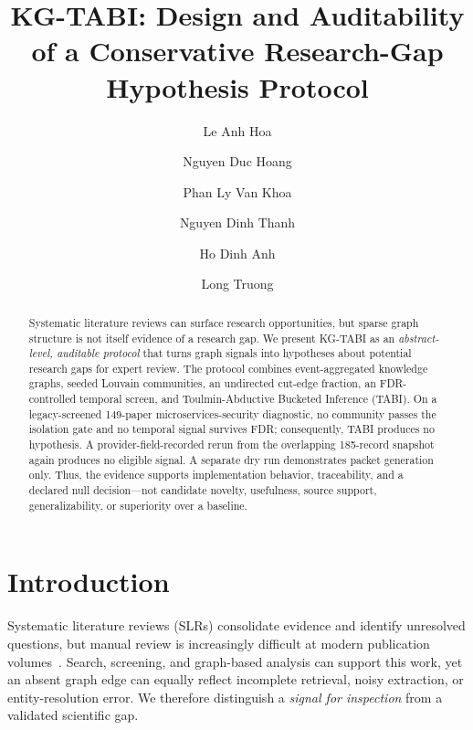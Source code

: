 \documentclass[runningheads]{llncs}
\begin{document}
\title{KG-TABI: Design and Auditability of a Conservative Research-Gap Hypothesis Protocol}
\author{Le Anh Hoa \and
Nguyen Duc Hoang \and
Phan Ly Van Khoa \and
Nguyen Dinh Thanh \and
Ho Dinh Anh \and
Long Truong}
\maketitle

\begin{abstract}
Systematic literature reviews can surface research opportunities, but sparse graph structure is not itself evidence of a research gap. We present KG-TABI as an \emph{abstract-level, auditable protocol} that turns graph signals into hypotheses about potential research gaps for expert review. The protocol combines event-aggregated knowledge graphs, seeded Louvain communities, an undirected cut-edge fraction, an FDR-controlled temporal screen, and Toulmin-Abductive Bucketed Inference (TABI). On a legacy-screened 149-paper microservices-security diagnostic, no community passes the isolation gate and no temporal signal survives FDR; consequently, TABI produces no hypothesis. A provider-field-recorded rerun from the overlapping 185-record snapshot again produces no eligible signal. A separate dry run demonstrates packet generation only. Thus, the evidence supports implementation behavior, traceability, and a declared null decision---not candidate novelty, usefulness, source support, generalizability, or superiority over a baseline.
\end{abstract}

\section{Introduction}
Systematic literature reviews (SLRs) consolidate evidence and identify unresolved questions, but manual review is increasingly difficult at modern publication volumes~\cite{kitchenham2007guidelines}. Search, screening, and graph-based analysis can support this work, yet an absent graph edge can equally reflect incomplete retrieval, noisy extraction, or entity-resolution error. We therefore distinguish a \emph{signal for inspection} from a validated scientific gap.
\end{document}
